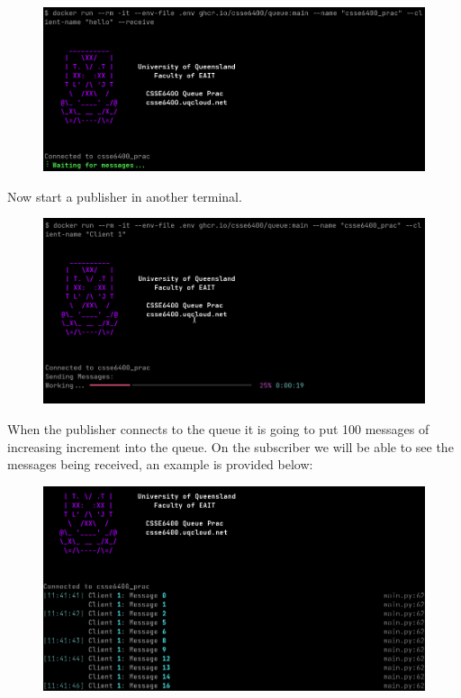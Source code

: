\documentclass{csse4400}
\begin{document}

\begin{figure}[H]
  \includegraphics[width=\textwidth]{images/stacksub}
\end{figure}

Now start a publisher in another terminal.


\begin{figure}[H]
  \includegraphics[width=\textwidth]{images/stackpub}
\end{figure}

When the publisher connects to the queue it is going to put 100 messages of increasing increment into the queue.
On the subscriber we will be able to see the messages being received, an example is provided below:

\begin{figure}[H]
  \includegraphics[width=\textwidth]{images/stacksubdata}
\end{figure}
\end{document}
